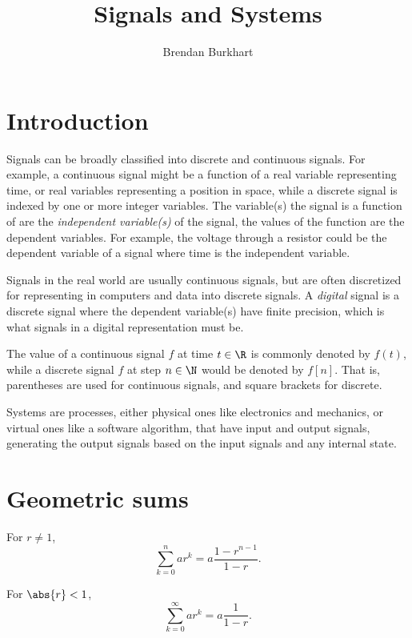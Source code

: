 \documentclass[12pt]{article}
\begin{document}
\title{Signals and Systems}
\author{Brendan Burkhart}
\maketitle

\tableofcontents
\newpage

\section{Introduction}

Signals can be broadly classified into discrete and continuous signals. For example, a continuous signal might be a function of a real variable representing time, or real variables representing a position in space, while a discrete signal is indexed by one or more integer variables. The variable(s) the signal is a function of are the \emph{independent variable(s)} of the signal, the values of the function are the dependent variables. For example, the voltage through a resistor could be the dependent variable of a signal where time is the independent variable.

Signals in the real world are usually continuous signals, but are often discretized for representing in computers and data into discrete signals. A \emph{digital} signal is a discrete signal where the dependent variable(s) have finite precision, which is what signals in a digital representation must be.

The value of a continuous signal $f$ at time $t \in \R$ is commonly denoted by $f(t)$, while a discrete signal $f$ at step $n \in \N$ would be denoted by $f[n]$. That is, parentheses are used for continuous signals, and square brackets for discrete.

Systems are processes, either physical ones like electronics and mechanics, or virtual ones like a software algorithm, that have input and output signals, generating the output signals based on the input signals and any internal state.

\section{Geometric sums}

\begin{prop}
    For $r \neq 1$,
    \[\sum_{k=0}^n{ar^k} = a\frac{1-r^{n-1}}{1-r}.\]
\end{prop}

\begin{prop}
    For $\abs{r} < 1$,
    \[\sum_{k=0}^\infty{ar^k} = a\frac{1}{1-r}.\]
\end{prop}
\end{document}
